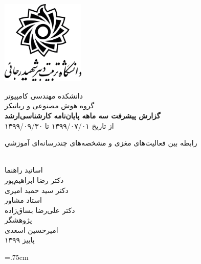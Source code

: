 \documentclass[12pt,a4paper]{article}
\begin{document}
	\thispagestyle{empty}
	\vspace*{-45mm}
	\centerline{\includegraphics[height=4cm]{figures/srulogofa.png}}
	\begin{center}
		
		\vspace{-3mm}
		دانشکده مهندسی کامپیوتر
		\\[.2cm]
		
		گروه هوش مصنوعی و رباتیکز
		\\[0.7cm]
		{\Large 
			\textbf{گزارش پیشرفت سه ماهه پایان‌نامه کارشناسی‌ارشد}
			\\[0.2cm]
			از تاریخ ۱۳۹۹/۰۷/۰۱ تا ۱۳۹۹/۰۹/۳۰
		}
		\\[.2cm]
		\baselineskip=1.5cm
		{\titr
			\begin{huge}
				رابطه بين فعاليت‌های مغزی و مشخصه‌های چندرسانه‌ای آموزشي
			\end{huge}
		}
		\\[0.7cm]
		{\large
			{\traffic 
				اساتید راهنما
			}
			\\
			{\large \nastaliq دکتر رضا ابراهیم‌پور
			\\
		دکتر سید حمید امیری }
			\\[.7cm]
			{\traffic
				استاد مشاور
				\\
			}
			{\large \nastaliq دکتر علی‌رضا بساق‌زاده
			}
			\\[.5cm]
			{\large\traffic  پژوهشگر
			}
		}
		\\
		{\large \nastaliq امیرحسین اسعدی}
		\\
		پاییز ۱۳۹۹
	\end{center}
\newpage
\baselineskip=1cm
\tableofcontents


\newpage
\listoffigures

\newpage
\baselineskip=.75cm


	

\setLTRbibitems


\end{document}
